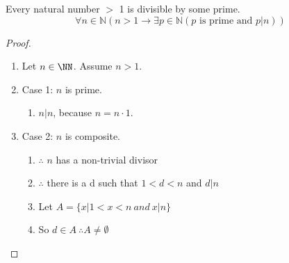 \begin{theorem}[Textbook 2.2.4]
Every natural number $>$ 1 is divisible by some prime. 
\[\forall n \in \mathbb{N} \left( n > 1 \to \exists p \in \mathbb{N} \left( p \text{ is prime and } p|n \right) \right) \]
\end{theorem}
\begin{proof}
\begin{enumerate}
\item Let $n\in\NN$. Assume $n>1$.
\item Case 1: $n$ is prime. 
\begin{enumerate}\item $n|n$, because $n = n \cdot 1$. \ck \end{enumerate}
\item Case 2: $n$ is composite.
\begin{enumerate}
	\item $\therefore$ $n$ has a non-trivial divisor
	\item $\therefore$ there is a d such that $1 < d < n$ and $d|n$
	\item Let $A = \{ x | 1 < x < n\ and\ x|n \}$
	\item So $d \in A\ \therefore A \neq \emptyset$
\end{enumerate}
\end{enumerate}
\end{proof}


